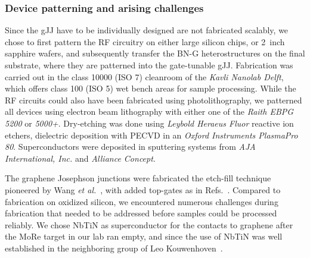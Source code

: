 \subsubsection{Device patterning and arising challenges}\label{sec:fabgJJ}

Since the gJJ have to be individually designed are not fabricated scalably, we chose to first pattern the RF circuitry on either large silicon chips, or \SI{2}{inch} sapphire wafers, and subsequently transfer the BN-G heterostructures on the final substrate, where they are patterned into the gate-tunable gJJ.
%
Fabrication was carried out in the class 10000 (ISO 7) cleanroom of the \textit{Kavli Nanolab Delft}, which offers class 100 (ISO 5) wet bench areas for sample processing.
%
While the RF circuits could also have been fabricated using photolithography, we patterned all devices using electron beam lithography with either one of the \textit{Raith EBPG 5200} or \textit{5000+}.
%
Dry-etching was done using \textit{Leybold Heraeus Fluor} reactive ion etchers, dielectric deposition with PECVD in an \textit{Oxford Instruments PlasmaPro 80}.
%
Superconductors were deposited in sputtering systems from \textit{AJA International, Inc.} and \textit{Alliance Concept}.

The graphene Josephson junctions were fabricated the etch-fill technique pioneered by Wang \textit{et al.}~\cite{wangOneDimensionalElectricalContact2013b}, with added top-gates as in Refs.~\cite{nandaCurrentPhaseRelationBallistic2017,schmidtBallisticGrapheneSuperconducting2018}.
%
Compared to fabrication on oxidized silicon, we encountered numerous challenges during fabrication that needed to be addressed before samples could be processed reliably.
%
We chose NbTiN as superconductor for the contacts to graphene after the MoRe target in our lab ran empty, and since the use of NbTiN was well established in the neighboring group of Leo Kouwenhoven~\cite{popinciucZerobiasConductancePeak2012,mourikSignaturesMajoranaFermions2012}.


